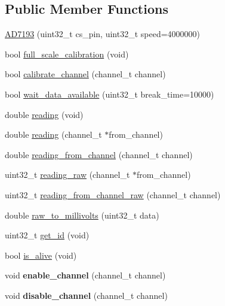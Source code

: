 \subsection*{Public Member Functions}
\begin{DoxyCompactItemize}
\item 
\hyperlink{classAD7193_a68e2fdae94a38bcd69e18c8eb0b9a95b}{A\+D7193} (uint32\+\_\+t cs\+\_\+pin, uint32\+\_\+t speed=4000000)
\item 
bool \hyperlink{classAD7193_a2fb0624cfd80ef47fede9203db4ae68b}{full\+\_\+scale\+\_\+calibration} (void)
\item 
bool \hyperlink{classAD7193_a8f58651520dbe473f2e67aeadb513d0c}{calibrate\+\_\+channel} (channel\+\_\+t channel)
\item 
bool \hyperlink{classAD7193_abbe6d0813d39dc3754c3f89abc81116a}{wait\+\_\+data\+\_\+available} (uint32\+\_\+t break\+\_\+time=10000)
\item 
double \hyperlink{classAD7193_ad3630825dd8ecdd7e24ef6e366273a41}{reading} (void)
\item 
double \hyperlink{classAD7193_a11dd9bbdd2f74a35495abf8647454786}{reading} (channel\+\_\+t $\ast$from\+\_\+channel)
\item 
double \hyperlink{classAD7193_adec3aae01cac5bb537a16647b858f196}{reading\+\_\+from\+\_\+channel} (channel\+\_\+t channel)
\item 
uint32\+\_\+t \hyperlink{classAD7193_a387482f8e82841faf32611b5044fbc52}{reading\+\_\+raw} (channel\+\_\+t $\ast$from\+\_\+channel)
\item 
uint32\+\_\+t \hyperlink{classAD7193_a1fee5a5abade344e7c1f5966ffebfddb}{reading\+\_\+from\+\_\+channel\+\_\+raw} (channel\+\_\+t channel)
\item 
double \hyperlink{classAD7193_aef2fc9da99f8f4aeae7add7f73b97a02}{raw\+\_\+to\+\_\+millivolts} (uint32\+\_\+t data)
\item 
uint32\+\_\+t \hyperlink{classAD7193_a77569593ee82b96dbe224dcb23262c5b}{get\+\_\+id} (void)
\item 
bool \hyperlink{classAD7193_a469f33f9363c4967b4eb95c76e846fbc}{is\+\_\+alive} (void)
\item 
\mbox{\label{classAD7193_a6324eb4976647125e1a04d92d4e6d3b9}} 
void {\bfseries enable\+\_\+channel} (channel\+\_\+t channel)
\item 
\mbox{\label{classAD7193_a47925cccd0810420a8da5e028e5688a1}} 
void {\bfseries disable\+\_\+channel} (channel\+\_\+t channel)

\end{DoxyCompactItemize}
